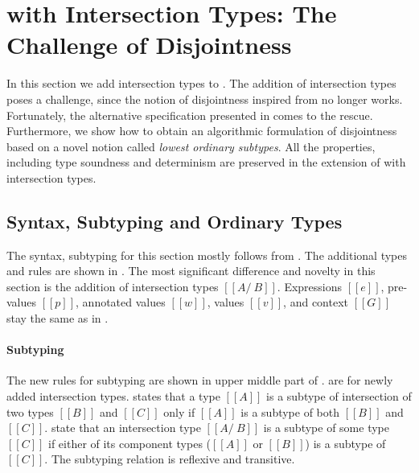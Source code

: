 \section{\cal with Intersection Types: The Challenge of Disjointness}
\label{sec:inter}

In this section we add intersection types to \cal.
The addition of intersection types poses a challenge,
since the notion of disjointness inspired from \citet{oliveira2016disjoint}
no longer works. Fortunately, the alternative specification presented in
 comes to the rescue. Furthermore, we show how to obtain
an algorithmic formulation of disjointness based on a novel notion
called \emph{lowest ordinary subtypes}. All the properties, including
type soundness and determinism are preserved in the extension of \cal
with intersection types.

\subsection{Syntax, Subtyping and Ordinary Types}
\label{sec:inter:system}
The syntax, subtyping for this section mostly follows
from .  The additional types and rules are shown in
.
The most significant difference and novelty in this section
is the addition of intersection types $[[A/\ B]]$.
Expressions $[[e]]$, pre-values $[[p]]$, annotated values $[[w]]$,
values $[[v]]$, and context $[[G]]$ stay the same as in .

\paragraph{Subtyping}
The new rules for subtyping are shown in upper middle part of
.   are for newly
added intersection types.  states that a type $[[A]]$ is
a subtype of intersection of two types $[[B]]$ and $[[C]]$ only if
$[[A]]$ is a subtype of both $[[B]]$ and $[[C]]$.  
state that an intersection type $[[A /\ B]]$ is a subtype
of some type $[[C]]$ if either of its component types ($[[A]]$ or
$[[B]]$) is a subtype of $[[C]]$. The subtyping relation is reflexive
and transitive.

